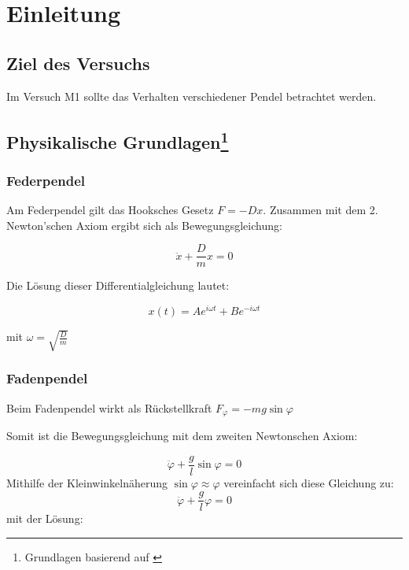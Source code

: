 \section{Einleitung}

\subsection{Ziel des Versuchs}
Im Versuch M1 sollte das Verhalten verschiedener Pendel betrachtet werden.
\subsection[Physikalische Grundlagen]{Physikalische Grundlagen\footnote{Grundlagen basierend auf \cite{giancoli2010physik,tipler2008physics,anleitung-ws2014}}}

\subsubsection{Federpendel}

Am Federpendel gilt das Hooksches Gesetz $ F=-Dx $. Zusammen mit dem 2. Newton'schen Axiom ergibt sich als Bewegungsgleichung:

\begin{equation}
\label{eq1.1}
\ddot{x}+\frac{D}{m}x=0
\end{equation}

Die Lösung dieser Differentialgleichung lautet:

\begin{equation}
\label{eq1.2}
x(t)=Ae^{i\omega t}+Be^{-i\omega t}
\end{equation} 

mit $ \omega=\sqrt{\frac{D}{m}} $

\subsubsection{Fadenpendel}
 
 Beim Fadenpendel wirkt als Rückstellkraft $ F_{\varphi}=-mg\sin\varphi $
 
 Somit ist die Bewegungsgleichung mit dem zweiten Newtonschen Axiom:
 
 \begin{equation}
 \label{eq1.3}
 \ddot\varphi+\frac{g}{l} \sin\varphi =0
 \end{equation}
 Mithilfe der Kleinwinkelnäherung $\sin \varphi \approx \varphi$ vereinfacht sich diese Gleichung zu: \begin{equation}
 	 \label{eq1.3.1}
 	 \ddot\varphi+\frac{g}{l} \varphi =0
 \end{equation}
 mit der Lösung:
 
